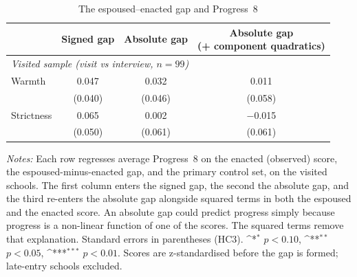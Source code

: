 \begin{table}[htbp]\centering
\caption{The espoused--enacted gap and Progress~8}
\label{tab:gaps}
\def\sym#1{\ifmmode^{#1}\else\(^{#1}\)\fi}
\small

\footnotesize\setlength{\tabcolsep}{4pt}
\begin{tabular}{lccc}
\toprule
 & Signed gap & Absolute gap & \shortstack{Absolute gap\\(+ component quadratics)} \\
\midrule
\multicolumn{4}{l}{\textit{Visited sample (visit vs interview, $n=99$)}} \\
\addlinespace[2pt]
Warmth & 0.047 & 0.032 & 0.011 \\
 & (0.040) & (0.046) & (0.058) \\
Strictness & 0.065 & 0.002 & $-$0.015 \\
 & (0.050) & (0.061) & (0.061) \\
\bottomrule
\end{tabular}
\begin{minipage}{\linewidth}
\smallskip
\footnotesize\textit{Notes:} Each row regresses average Progress~8 on the enacted (observed) score, the espoused-minus-enacted gap, and the primary control set, on the visited schools. The first column enters the signed gap, the second the absolute gap, and the third re-enters the absolute gap alongside squared terms in both the espoused and the enacted score. An absolute gap could predict progress simply because progress is a non-linear function of one of the scores. The squared terms remove that explanation. Standard errors in parentheses (HC3).
\sym{*} \(p<0.10\), \sym{**} \(p<0.05\), \sym{***} \(p<0.01\).
Scores are z-standardised before the gap is formed; late-entry schools excluded. 
\end{minipage}
\end{table}
